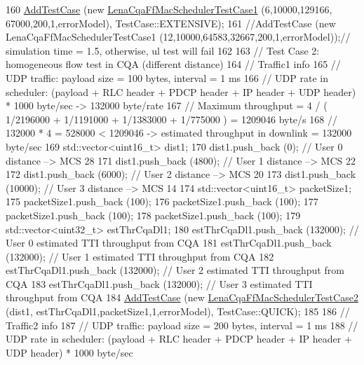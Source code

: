 \begin{DoxyCode}
160   \hyperlink{classns3_1_1TestCase_a3718088e3eefd5d6454569d2e0ddd835}{AddTestCase} (\textcolor{keyword}{new} \hyperlink{classLenaCqaFfMacSchedulerTestCase1}{LenaCqaFfMacSchedulerTestCase1} (6,10000,129166,
      67000,200,1,errorModel), TestCase::EXTENSIVE);
161   \textcolor{comment}{//AddTestCase (new LenaCqaFfMacSchedulerTestCase1 (12,10000,64583,32667,200,1,errorModel));// simulation
       time = 1.5, otherwise, ul test will fail}
162 
163   \textcolor{comment}{// Test Case 2: homogeneous flow test in CQA (different distance)}
164   \textcolor{comment}{// Traffic1 info}
165   \textcolor{comment}{//   UDP traffic: payload size = 100 bytes, interval = 1 ms}
166   \textcolor{comment}{//   UDP rate in scheduler: (payload + RLC header + PDCP header + IP header + UDP header) * 1000 byte/sec
       -> 132000 byte/rate }
167   \textcolor{comment}{// Maximum throughput = 4 / ( 1/2196000 + 1/1191000 + 1/1383000 + 1/775000 ) = 1209046 byte/s}
168   \textcolor{comment}{// 132000 * 4 = 528000 < 1209046 -> estimated throughput in downlink = 132000 byte/sec}
169   std::vector<uint16\_t> dist1;
170   dist1.push\_back (0);       \textcolor{comment}{// User 0 distance --> MCS 28}
171   dist1.push\_back (4800);    \textcolor{comment}{// User 1 distance --> MCS 22}
172   dist1.push\_back (6000);    \textcolor{comment}{// User 2 distance --> MCS 20}
173   dist1.push\_back (10000);   \textcolor{comment}{// User 3 distance --> MCS 14}
174   std::vector<uint16\_t> packetSize1;
175   packetSize1.push\_back (100);
176   packetSize1.push\_back (100);
177   packetSize1.push\_back (100);
178   packetSize1.push\_back (100);
179   std::vector<uint32\_t> estThrCqaDl1;
180   estThrCqaDl1.push\_back (132000); \textcolor{comment}{// User 0 estimated TTI throughput from CQA}
181   estThrCqaDl1.push\_back (132000); \textcolor{comment}{// User 1 estimated TTI throughput from CQA}
182   estThrCqaDl1.push\_back (132000); \textcolor{comment}{// User 2 estimated TTI throughput from CQA}
183   estThrCqaDl1.push\_back (132000); \textcolor{comment}{// User 3 estimated TTI throughput from CQA}
184   \hyperlink{classns3_1_1TestCase_a3718088e3eefd5d6454569d2e0ddd835}{AddTestCase} (\textcolor{keyword}{new} \hyperlink{classLenaCqaFfMacSchedulerTestCase2}{LenaCqaFfMacSchedulerTestCase2} (dist1,
      estThrCqaDl1,packetSize1,1,errorModel), TestCase::QUICK);
185 
186   \textcolor{comment}{// Traffic2 info}
187   \textcolor{comment}{//   UDP traffic: payload size = 200 bytes, interval = 1 ms}
188   \textcolor{comment}{//   UDP rate in scheduler: (payload + RLC header + PDCP header + IP header + UDP header) * 1000 byte/sec
}
\end{DoxyCode}
